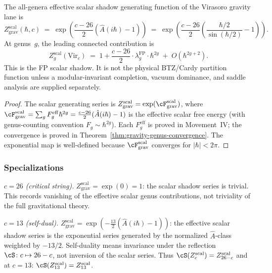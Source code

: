 \begin{theorem}
\label{thm:gravity-partition-function-explicit}
The all-genera effective scalar shadow generating function of the
Virasoro gravity lane is
\begin{equation}\label{eq:gravity-Z-explicit}
Z_{\mathrm{grav}}^{\mathrm{scal}}(\hbar, c)
\;=\;
\exp\!\left(
 \frac{c-26}{2}\left(\hat A(i\hbar) - 1\right)
\right)
\;=\;
\exp\!\left(
 \frac{c-26}{2}
 \left(
 \frac{\hbar/2}{\sin(\hbar/2)} - 1
 \right)
\right).
\end{equation}
At genus~$g$, the leading connected contribution is
\[
Z_g^{\mathrm{scal}}(\mathrm{Vir}_c)
\;=\;
1 + \frac{c-26}{2}\cdot\lambda_g^{\mathrm{FP}}
 \cdot\hbar^{2g}
\;+\; O(\hbar^{2g+2}).
\]
This is the FP scalar shadow. It is not the physical BTZ/Cardy
partition function unless a modular-invariant completion, vacuum
dominance, and saddle analysis are supplied separately.
\end{theorem}

\begin{proof}
The scalar generating series is
$Z_{\mathrm{grav}}^{\mathrm{scal}}
= \exp(\cF_{\mathrm{grav}}^{\mathrm{scal}})$, where
$\cF_{\mathrm{grav}}^{\mathrm{scal}}
= \sum_g F_g^{\mathrm{eff}} \hbar^{2g}
= \frac{c-26}{2}(\hat A(i\hbar) - 1)$ is the effective scalar free
energy (with genus-counting convention
$F_g \sim \hbar^{2g}$). Each $F_g^{\mathrm{eff}}$ is proved in Movement~IV; the
convergence is proved in
Theorem~\ref{thm:gravity-genus-convergence}. The
exponential map is well-defined because
$\cF_{\mathrm{grav}}^{\mathrm{scal}}$ converges for
$|\hbar| < 2\pi$.
\end{proof}

\subsubsection*{Specializations}

\emph{$c = 26$ (critical string).}\enspace
$Z_{\mathrm{grav}}^{\mathrm{scal}} = \exp(0) = 1$: the scalar
shadow series is trivial. This records vanishing of the effective
scalar genus contributions, not triviality of the full gravitational
theory.

\emph{$c = 13$ (self-dual).}\enspace
$Z_{\mathrm{grav}}^{\mathrm{scal}}
= \exp\!\left(-\frac{13}{2}(\hat A(i\hbar) - 1)\right)$:
the effective scalar shadow series is the exponential series generated
by the normalized $\hat A$-class weighted by $-13/2$. Self-duality
means invariance under the reflection
$\cS\colon c\mapsto 26-c$, not inversion of the scalar series. Thus
$\cS(Z_c^{\mathrm{scal}}) = Z_{26-c}^{\mathrm{scal}}$ and at $c = 13$:
$\cS(Z_{13}^{\mathrm{scal}}) = Z_{13}^{\mathrm{scal}}$.

